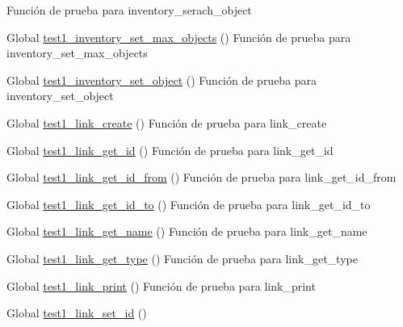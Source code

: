 \begin{DoxyRefList}
Función de prueba para inventory\+\_\+serach\+\_\+object  
\item[Global \mbox{\hyperlink{inventory__test_8c_aedc895d6409678b2176d822c105c3796}{test1\+\_\+inventory\+\_\+set\+\_\+max\+\_\+objects}} ()]\label{test__test000072}%
%
Función de prueba para inventory\+\_\+set\+\_\+max\+\_\+objects  
\item[Global \mbox{\hyperlink{inventory__test_8c_a68cdc4960d6ba206a27e71f82486ecd5}{test1\+\_\+inventory\+\_\+set\+\_\+object}} ()]\label{test__test000044}%
%
Función de prueba para inventory\+\_\+set\+\_\+object  
\item[Global \mbox{\hyperlink{link__test_8c_a82c5ee441ad22caad8272212a9e9cc26}{test1\+\_\+link\+\_\+create}} ()]\label{test__test000077}%
%
Función de prueba para link\+\_\+create  
\item[Global \mbox{\hyperlink{link__test_8c_a19c70f79fd51d123173f7aaf6ae50bf8}{test1\+\_\+link\+\_\+get\+\_\+id}} ()]\label{test__test000079}%
%
Función de prueba para link\+\_\+get\+\_\+id  
\item[Global \mbox{\hyperlink{link__test_8c_afa73dec9abb033137aa2df1a9b9a4871}{test1\+\_\+link\+\_\+get\+\_\+id\+\_\+from}} ()]\label{test__test000089}%
%
Función de prueba para link\+\_\+get\+\_\+id\+\_\+from  
\item[Global \mbox{\hyperlink{link__test_8c_ad22c05b585a7e1b67ba92f81796b5280}{test1\+\_\+link\+\_\+get\+\_\+id\+\_\+to}} ()]\label{test__test000094}%
%
Función de prueba para link\+\_\+get\+\_\+id\+\_\+to  
\item[Global \mbox{\hyperlink{link__test_8c_a044128db00a5cc385d7157dea8bdf3c3}{test1\+\_\+link\+\_\+get\+\_\+name}} ()]\label{test__test000084}%
%
Función de prueba para link\+\_\+get\+\_\+name  
\item[Global \mbox{\hyperlink{link__test_8c_a8217bf56aaf41d90bcadc4b4544d20d0}{test1\+\_\+link\+\_\+get\+\_\+type}} ()]\label{test__test000099}%
%
Función de prueba para link\+\_\+get\+\_\+type  
\item[Global \mbox{\hyperlink{link__test_8c_af99aa73f22b107610780db4877e34448}{test1\+\_\+link\+\_\+print}} ()]\label{test__test000103}%
%
Función de prueba para link\+\_\+print  
\item[Global \mbox{\hyperlink{link__test_8c_ac2b67785fdf6bb85af93e985af9ee3f2}{test1\+\_\+link\+\_\+set\+\_\+id}} ()]\label{test__test000081}%

\end{DoxyRefList}
